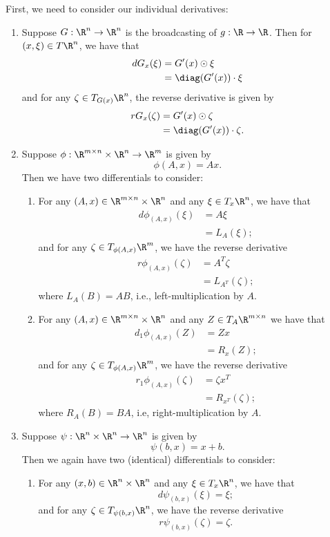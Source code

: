First, we need to consider our individual derivatives:
\begin{enumerate}
	\item Suppose $G:\R^n\to\R^n$ is the broadcasting of $g:\R\to\R$.  Then for $(x,\xi)\in T\R^n$, we have that
	\begin{align*}
		dG_x(\xi)&=G'(x)\odot\xi\\
		&=\diag(G'(x))\cdot\xi
	\end{align*}
	and for any $\zeta\in T_{G(x)}\R^n$, the reverse derivative is given by
	\begin{align*}
		rG_x(\zeta)&=G'(x)\odot\zeta\\
		&=\diag(G'(x))\cdot\zeta.
	\end{align*}
	
	\item Suppose $\phi:\R^{m\times n}\times\R^n\to\R^m$ is given by $$\phi(A,x)=Ax.$$
	Then we have two differentials to consider:
	\begin{enumerate}
		\item For any $(A,x)\in\R^{m\times n}\times\R^n$ and any $\xi\in T_x\R^n$, we have that
		\begin{align*}
			d\phi_{(A,x)}(\xi)&=A\xi\\
			&=L_A(\xi);
		\end{align*}
		and for any $\zeta\in T_{\phi(A,x)}\R^m$, we have the reverse derivative
		\begin{align*}
			r\phi_{(A,x)}(\zeta)&=A^T\zeta\\
			&=L_{A^T}(\zeta);
		\end{align*}
		where $L_A(B)=AB$, i.e., left-multiplication by $A$.
		
		\item For any $(A,x)\in\R^{m\times n}\times\R^n$ and any $Z\in T_A\R^{m\times n}$ we have that
		\begin{align*}
			d_1\phi_{(A,x)}(Z)&=Zx\\
			&=R_x(Z);
		\end{align*}
		and for any $\zeta\in T_{\phi(A,x)}\R^m$, we have the reverse derivative
		\begin{align*}
		r_1\phi_{(A,x)}(\zeta)&=\zeta x^T\\
		&=R_{x^T}(\zeta);	
		\end{align*}
		where $R_A(B)=BA$, i.e, right-multiplication by $A$.

	\end{enumerate}
	
	\item Suppose $\psi:\R^n\times\R^n\to\R^n$ is given by
	$$\psi(b,x)=x+b.$$
	Then we again have two (identical) differentials to consider:
	\begin{enumerate}
		\item For any $(x,b)\in\R^n\times\R^n$ and any $\xi\in T_x\R^n$, we have that
		$$d\psi_{(b,x)}(\xi)=\xi;$$
		and for any $\zeta\in T_{\psi(b,x)}\R^n$, we have the reverse derivative
		$$r\psi_{(b,x)}(\zeta)=\zeta.$$
		

\end{enumerate}
\end{enumerate}
